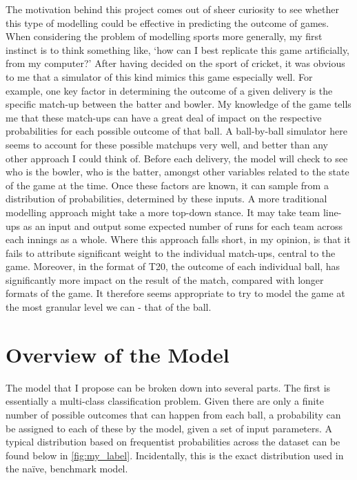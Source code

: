 The motivation behind this project comes out of sheer curiosity to see whether this type of modelling could be effective in predicting the outcome of games. When considering the problem of modelling sports more generally, my first instinct is to think something like, ‘how can I best replicate this game artificially, from my computer?’ After having decided on the sport of cricket, it was obvious to me that a simulator of this kind mimics this game especially well. For example, one key factor in determining the outcome of a given delivery is the specific match-up between the batter and bowler. My knowledge of the game tells me that these match-ups can have a great deal of impact on the respective probabilities for each possible outcome of that ball. A ball-by-ball simulator here seems to account for these possible matchups very well, and better than any other approach I could think of. Before each delivery, the model will check to see who is the bowler, who is the batter, amongst other variables related to the state of the game at the time. Once these factors are known, it can sample from a distribution of probabilities, determined by these inputs. A more traditional modelling approach might take a more top-down stance. It may take team line-ups as an input and output some expected number of runs for each team across each innings as a whole. Where this approach falls short, in my opinion, is that it fails to attribute significant weight to the individual match-ups, central to the game. Moreover, in the format of T20, the outcome of each individual ball, has significantly more impact on the result of the match, compared with longer formats of the game. It therefore seems appropriate to try to model the game at the most granular level we can - that of the ball. 

\section{Overview of the Model}

The model that I propose can be broken down into several parts. The first is essentially a multi-class classification problem. Given there are only a finite number of possible outcomes that can happen from each ball, a probability can be assigned to each of these by the model, given a set of input parameters. A typical distribution based on frequentist probabilities across the dataset can be found below in \autoref{fig:my_label}. Incidentally, this is the exact distribution used in the naïve, benchmark model.

